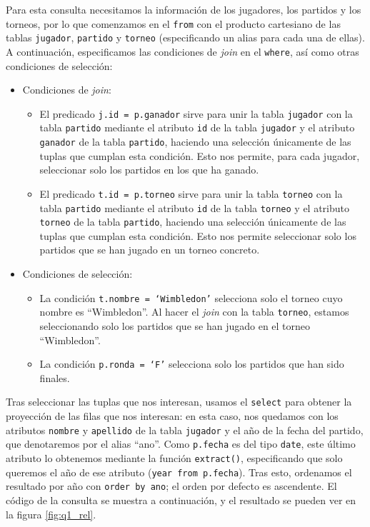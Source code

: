 \documentclass[11pt]{opticajnl}
\begin{document}
Para esta consulta necesitamos la información de los jugadores, los partidos y los torneos, por lo que comenzamos en el \texttt{from} con el producto cartesiano de las tablas \texttt{jugador}, \texttt{partido} y \texttt{torneo} (especificando un alias para cada una de ellas). A continuación, especificamos las condiciones de \textit{join} en el \texttt{where}, así como otras condiciones de selección: 
\begin{itemize}
\item Condiciones de \textit{join}:
\begin{itemize}
\item El predicado \texttt{j.id = p.ganador} sirve para unir la tabla \texttt{jugador} con la tabla \texttt{partido} mediante el atributo \texttt{id} de la tabla \texttt{jugador} y el atributo \texttt{ganador} de la tabla \texttt{partido}, haciendo una selección únicamente de las tuplas que cumplan esta condición. Esto nos permite, para cada jugador, seleccionar solo los partidos en los que ha ganado.
\item El predicado \texttt{t.id = p.torneo} sirve para unir la tabla \texttt{torneo} con la tabla \texttt{partido} mediante el atributo \texttt{id} de la tabla \texttt{torneo} y el atributo \texttt{torneo} de la tabla \texttt{partido}, haciendo una selección únicamente de las tuplas que cumplan esta condición. Esto nos permite seleccionar solo los partidos que se han jugado en un torneo concreto.
\end{itemize}
\item Condiciones de selección:
\begin{itemize}
\item La condición \texttt{t.nombre = `Wimbledon'} selecciona solo el torneo cuyo nombre es ``Wimbledon''. Al hacer el \textit{join} con la tabla \texttt{torneo}, estamos seleccionando solo los partidos que se han jugado en el torneo ``Wimbledon''.
\item La condición \texttt{p.ronda = `F'} selecciona solo los partidos que han sido finales.
\end{itemize}
\end{itemize}

Tras seleccionar las tuplas que nos interesan, usamos el \texttt{select} para obtener la proyección de las filas que nos interesan: en esta caso, nos quedamos con los atributos \texttt{nombre} y \texttt{apellido} de la tabla \texttt{jugador} y el año de la fecha del partido, que denotaremos por el alias ``ano''. Como \texttt{p.fecha} es del tipo \texttt{date}, este último atributo lo obtenemos mediante la función \texttt{extract()}, especificando que solo queremos el año de ese atributo (\texttt{year from p.fecha}). Tras esto, ordenamos el resultado por año con \texttt{order by ano}; el orden por defecto es ascendente. El código de la consulta se muestra a continuación, y el resultado se pueden ver en la figura \ref{fig:q1_rel}.
\end{document}
